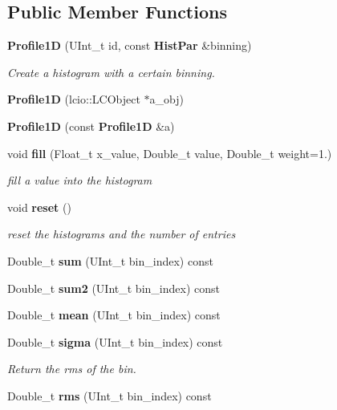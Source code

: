 \subsection*{Public Member Functions}
\begin{DoxyCompactItemize}
\item 
{\bf Profile1D} (UInt\_\-t id, const {\bf HistPar} \&binning)
\begin{DoxyCompactList}\small\item\em Create a histogram with a certain binning. \item\end{DoxyCompactList}\item 
{\bfseries Profile1D} (lcio::LCObject $\ast$a\_\-obj)\label{classhistmgr_1_1Profile1D_a4789d7e34227713903e379a1ec7d3962}

\item 
{\bfseries Profile1D} (const {\bf Profile1D} \&a)\label{classhistmgr_1_1Profile1D_a7a6d403d74f7d436a5cbb68016580511}

\item 
void {\bf fill} (Float\_\-t x\_\-value, Double\_\-t value, Double\_\-t weight=1.)\label{classhistmgr_1_1Profile1D_a85d6672aca865b96e557323d3095b94c}

\begin{DoxyCompactList}\small\item\em fill a value into the histogram \item\end{DoxyCompactList}\item 
void {\bf reset} ()\label{classhistmgr_1_1Profile1D_a0aff38e965618142af8ecda50b721d4f}

\begin{DoxyCompactList}\small\item\em reset the histograms and the number of entries \item\end{DoxyCompactList}\item 
Double\_\-t {\bf sum} (UInt\_\-t bin\_\-index) const 
\item 
Double\_\-t {\bfseries sum2} (UInt\_\-t bin\_\-index) const \label{classhistmgr_1_1Profile1D_a27a5f854b0de6cd760a1be589a9165ef}

\item 
Double\_\-t {\bfseries mean} (UInt\_\-t bin\_\-index) const \label{classhistmgr_1_1Profile1D_a3aabceab2ad741e243aedea0bb3598d7}

\item 
Double\_\-t {\bf sigma} (UInt\_\-t bin\_\-index) const 
\begin{DoxyCompactList}\small\item\em Return the rms of the bin. \item\end{DoxyCompactList}\item 
Double\_\-t {\bfseries rms} (UInt\_\-t bin\_\-index) const \label{classhistmgr_1_1Profile1D_a25ee461c0728a5bed40dc6b020b5b220}


\end{DoxyCompactItemize}
